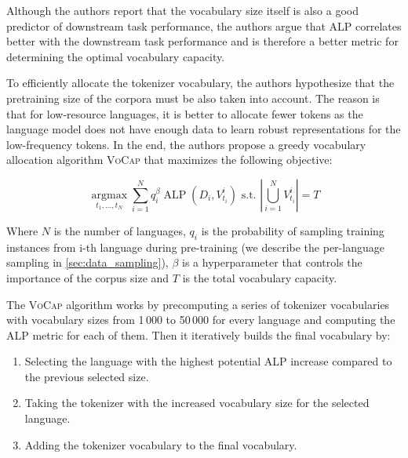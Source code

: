 Although the authors report that the vocabulary size itself is also a good predictor of downstream task performance, the authors argue that ALP correlates better with the downstream task performance and is therefore a better metric for determining the optimal vocabulary capacity.



To efficiently allocate the tokenizer vocabulary, the authors hypothesize that the pretraining size of the corpora must be also taken into account. The reason is that for low-resource languages, it is better to allocate fewer tokens as the language model does not have enough data to learn robust representations for the low-frequency tokens. In the end, the authors propose a greedy vocabulary allocation algorithm \textsc{VoCap} that maximizes the following objective:

$$
\underset{t_1, \ldots, t_N}{\operatorname{argmax}} \sum_{i=1}^N q_i^\beta \operatorname{ALP}\left(D_i, V_{t_i}^i\right) \text { s.t. }\left|\bigcup_{i=1}^N V_{t_i}^i\right|=T
$$

Where $N$ is the number of languages, $q_i$ is the probability of sampling training instances from i-th language during pre-training (we describe the per-language sampling in \autoref{sec:data_sampling}), $\beta$ is a hyperparameter that controls the importance of the corpus size and $T$ is the total vocabulary capacity. 

The \textsc{VoCap} algorithm works by precomputing a series of tokenizer vocabularies with vocabulary sizes from 1\,000 to 50\,000 for every language and computing the ALP metric for each of them. Then it iteratively builds the final vocabulary by:

\begin{enumerate}
    \item Selecting the language with the highest potential ALP increase compared to the previous selected size.
    \item Taking the tokenizer with the increased vocabulary size for the selected language.
    \item Adding the tokenizer vocabulary to the final vocabulary.
\end{enumerate}

